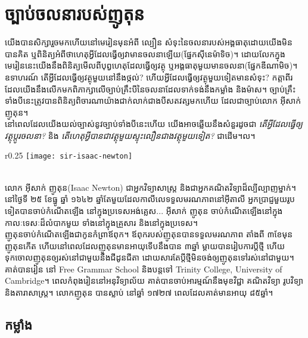 \chapter{ច្បាប់ចលនារបស់ញូតុន}
\begin{introduction}
	\quad យើងបានសិក្សារួចមកហើយនៅមេរៀនមុនអំពី ល្បឿន សំទុះនៃចលនារបស់អង្គធាតុដោយយើងមិនបានគិត ឬពិនិត្យអំពីថាហេតុអ្វីដែលធ្វើឲ្យវាមានចលនាឡើយ(ផ្នែកស៊ីនេម៉ាទិច)។ ដោយលែកក្នុងមេរៀននេះយើងនឹងពិនិត្យមើលពីបុព្វហេតុដែលធ្វើឲ្យវត្ថុ ឬអង្គធាតុមួយមានចលនា(ផ្នែកឌីណាមិច)។ ឧទាហរណ៍ តើអ្វីដែលធ្វើឲ្យវត្ថុមួយនៅនឹងថ្កល់? ហើយអ្វីដែលធ្វើឲ្យវត្ថុមួយទៀតមានសំទុះ? កត្តាពីរដែលយើងនឹងលើកមកពិភាក្សាលើច្បាប់គ្រឹះបីនៃចលនាដែលទាក់ទង់នឹងកម្លាំង និងម៉ាស។ ច្បាប់គ្រឹះទាំងបីនេះត្រូវបានពិនិត្យពិចារណាយ៉ាងជាក់លាក់ជាងបីសតវត្សមកហើយ ដែលជាច្បាប់លោក អុីសាក់ ញូតុន។\\
	នៅពេលដែលយើងយល់ច្បាស់នូវច្បាប់ទាំងបីនេះហើយ យើងអាចឆ្លើយនឹងសំនួរដូចជា \textit{តើអ្វីដែលធ្វើឲ្យវត្ថុប្តូរចលនា?} និង \textit{តើហេតុអ្វីបានជាវត្ថុមួយស្ទុះលឿនជាងវត្ថុមួយទៀត?} ជាដើម។ល។
\end{introduction}
\begin{biography}
		\begin{wrapfigure}{r}{0.25\textwidth}
			\centering
			\texttt{[image: sir-isaac-newton]}\\
			\\
		\end{wrapfigure}
		\quad លោក អ៊ីសាក់ ញូតុន{\en (Isaac Newton)} ជាអ្នកវិទ្យាសាស្ត្រ និងជាអ្នកគណិតវិទ្យាដ៏ល្បីល្បាញម្នាក់។ នៅថ្ងៃទី ២៥ ខែធ្នូ ឆ្នាំ ១៦៤២  ឆ្នាំតែមួយ​ដែល​កាលីលេ​ទទួលមរណភាព​នៅ​អ៊ីតាលី អ្ន​កប្រាជ្ញ​មួយរូបទៀត​បាន​ចាប់កំណើតឡើង នៅ​ក្នុង​ប្រទេស​អង់គ្លេស... អ៊ីសាក់ ញូតុន ​ចាប់កំណើតឡើង​នៅ​ក្នុង​កាលៈទេសៈ​ដ៏លំបាក​មួយ ទាំង​នៅ​ក្នុង​គ្រួសារ និង​នៅ​ក្នុង​ប្រទេស។\\
		ញូតុន​​ចាប់កំណើត​ឡើង​​​ជា​កូនកំព្រា​ឪពុក។ ឪពុក​របស់​ញូតុន​​បាន​ទទួលមរណភាព​ តាំង​ពី ៣ខែមុន​ញូតុន​កើត ហើយ​នៅពេល​ដែល​ញូតុន​មាន​អាយុ​ទើប​នឹង​បាន ៣ឆ្នាំ ម្តាយ​បាន​រៀបការ​ប្តីថ្មី ហើយ​ទុកចោល​​ញូតុន​ឲ្យ​រស់នៅ​ជាមួយ​នឹង​ជីដូនជីតា ដោយសារ​តែ​ប្តីថ្មី​មិនចង់​ឲ្យ​ញូតុន​ទៅ​រស់នៅ​ជាមួយ។\\
		គាត់បានរៀន នៅ {\en Free Grammar School} និងបន្តទៅ {\en Trinity College, University of Cambridge}។ ពេលកំពុងរៀននៅអនុវិទ្យាល័យ គាត់បានចាប់អារម្មណ៍នឹងមុខវិជ្ជា គណិតវិទ្យា រូបវិទ្យា និងតារាសាស្រ្ត។ លោកញូតុន បានស្លាប់ នៅឆ្នាំ ១៧២៧  ពេលដែលគាត់មានអាយុ ៨៥ឆ្នាំ។
\end{biography}
\section{កម្លាំង}
